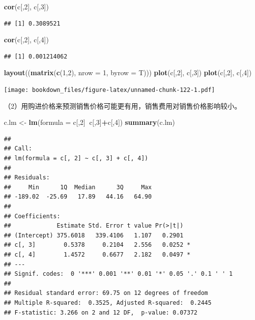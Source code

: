 \documentclass[]{ctexbook}
\newenvironment{Shaded}{\begin{snugshade}}{\end{snugshade}}
\newcommand{\DataTypeTok}[1]{\textcolor[rgb]{0.13,0.29,0.53}{#1}}
\newcommand{\DecValTok}[1]{\textcolor[rgb]{0.00,0.00,0.81}{#1}}
\newcommand{\KeywordTok}[1]{\textcolor[rgb]{0.13,0.29,0.53}{\textbf{#1}}}
\newcommand{\NormalTok}[1]{#1}
\newcommand{\OperatorTok}[1]{\textcolor[rgb]{0.81,0.36,0.00}{\textbf{#1}}}
\newcommand{\StringTok}[1]{\textcolor[rgb]{0.31,0.60,0.02}{#1}}
\begin{document}
\begin{Shaded}
\begin{Highlighting}[]
\KeywordTok{cor}\NormalTok{(c[,}\DecValTok{2}\NormalTok{], c[,}\DecValTok{3}\NormalTok{])}
\end{Highlighting}
\end{Shaded}

\begin{verbatim}
## [1] 0.3089521
\end{verbatim}

\begin{Shaded}
\begin{Highlighting}[]
\KeywordTok{cor}\NormalTok{(c[,}\DecValTok{2}\NormalTok{], c[,}\DecValTok{4}\NormalTok{])}
\end{Highlighting}
\end{Shaded}

\begin{verbatim}
## [1] 0.001214062
\end{verbatim}

\begin{Shaded}
\begin{Highlighting}[]
\KeywordTok{layout}\NormalTok{((}\KeywordTok{matrix}\NormalTok{(}\KeywordTok{c}\NormalTok{(}\DecValTok{1}\NormalTok{,}\DecValTok{2}\NormalTok{), }\DataTypeTok{nrow =} \DecValTok{1}\NormalTok{, }\DataTypeTok{byrow =}\NormalTok{ T)))}
\KeywordTok{plot}\NormalTok{(c[,}\DecValTok{2}\NormalTok{], c[,}\DecValTok{3}\NormalTok{])}
\KeywordTok{plot}\NormalTok{(c[,}\DecValTok{2}\NormalTok{], c[,}\DecValTok{4}\NormalTok{])}
\end{Highlighting}
\end{Shaded}

\texttt{[image: bookdown\_files/figure-latex/unnamed-chunk-122-1.pdf]}

（2）用购进价格来预测销售价格可能更有用，销售费用对销售价格影响较小。

\begin{Shaded}
\begin{Highlighting}[]
\NormalTok{c.lm <-}\StringTok{ }\KeywordTok{lm}\NormalTok{(}\DataTypeTok{formula =}\NormalTok{ c[,}\DecValTok{2}\NormalTok{]}\OperatorTok{~}\NormalTok{c[,}\DecValTok{3}\NormalTok{]}\OperatorTok{+}\NormalTok{c[,}\DecValTok{4}\NormalTok{])}
\KeywordTok{summary}\NormalTok{(c.lm)}
\end{Highlighting}
\end{Shaded}

\begin{verbatim}
## 
## Call:
## lm(formula = c[, 2] ~ c[, 3] + c[, 4])
## 
## Residuals:
##     Min      1Q  Median      3Q     Max 
## -189.02  -25.69   17.89   44.16   64.90 
## 
## Coefficients:
##             Estimate Std. Error t value Pr(>|t|)  
## (Intercept) 375.6018   339.4106   1.107   0.2901  
## c[, 3]        0.5378     0.2104   2.556   0.0252 *
## c[, 4]        1.4572     0.6677   2.182   0.0497 *
## ---
## Signif. codes:  0 '***' 0.001 '**' 0.01 '*' 0.05 '.' 0.1 ' ' 1
## 
## Residual standard error: 69.75 on 12 degrees of freedom
## Multiple R-squared:  0.3525, Adjusted R-squared:  0.2445 
## F-statistic: 3.266 on 2 and 12 DF,  p-value: 0.07372
\end{verbatim}
\end{document}
